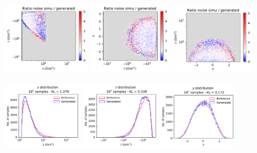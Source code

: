 \documentclass[twocolumn,preprintnumbers,superscriptaddress]{revtex4-2}
\begin{document}
\begin{figure}
  \includegraphics[width=0.32\textwidth]{plots/hardware_noise_simulation/s-t_RATIO_100k_noise-generated.pdf}%
  \includegraphics[width=0.305\textwidth]{plots/hardware_noise_simulation/t-y_RATIO_100k_noise-generated.pdf}%
  \includegraphics[width=0.31\textwidth]{plots/hardware_noise_simulation/y-s_RATIO_100k_noise-generated.pdf}

  \includegraphics[width=0.29\textwidth]{plots/hardware_noise_simulation/s-distribution_LHCdata_100k_noise-simu.pdf}%
  \includegraphics[width=0.29\textwidth]{plots/hardware_noise_simulation/t-distribution_LHCdata_100k_noise-simu.pdf}%
  \includegraphics[width=0.29\textwidth]{plots/hardware_noise_simulation/y-distribution_LHCdata_100k_noise-simu.pdf}


\end{figure}
\end{document}
